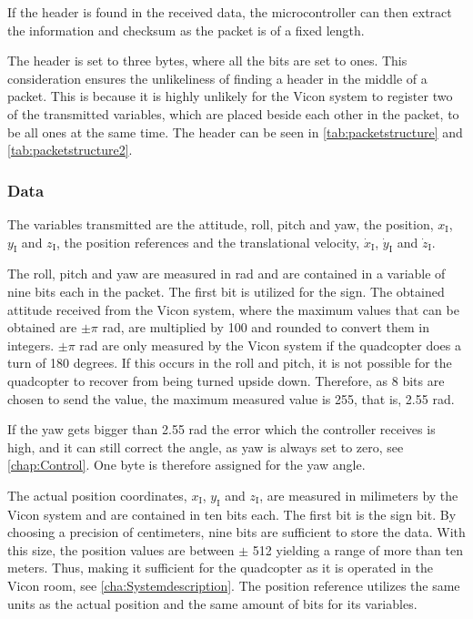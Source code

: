 If the header is found in the received data, the microcontroller can then extract the information and checksum as the packet is of a fixed length. 

The header is set to three bytes, where all the bits are set to ones. This consideration ensures the unlikeliness of finding a header in the middle of a packet. This is because it is highly unlikely for the Vicon system to register two of the transmitted variables, which are placed beside each other in the packet, to be all ones at the same time. The header can be seen in \autoref{tab:packetstructure} and \autoref{tab:packetstructure2}.

\subsubsection{Data} 
The variables transmitted are the attitude, roll, pitch and yaw, the position, $x_{\mathrm{I}}$, $y_{\mathrm{I}}$ and $z_{\mathrm{I}}$, the position references and the translational velocity, $\dot{x}_{\mathrm{I}}$, $\dot{y}_{\mathrm{I}}$ and $\dot{z}_{\mathrm{I}}$. 

The roll, pitch and yaw are measured in rad and are contained in a variable of nine bits each in the packet. The first bit is utilized for the sign. The obtained attitude received from the Vicon system, where the maximum values that can be obtained are $\pm\pi$ rad, are multiplied by 100 and rounded to convert them in integers. $\pm\pi$ rad are only measured by the Vicon system if the quadcopter does a turn of 180 degrees. If this occurs in the roll and pitch, it is not possible for the quadcopter to recover from being turned upside down. Therefore, as 8 bits are chosen to send the value, the maximum measured value is 255, that is, 2.55 rad.

%
%

If the yaw gets bigger than 2.55 rad the error which the controller receives is high, and it can still correct the angle, as yaw is always set to zero, see \autoref{chap:Control}. One byte is therefore assigned for the yaw angle.

The actual position coordinates, $x_{\mathrm{I}}$, $y_{\mathrm{I}}$ and $z_{\mathrm{I}}$, are measured in milimeters by the Vicon system and are contained in ten bits each. The first bit is the sign bit. By choosing a precision of centimeters, nine bits are sufficient to store the data. With this size, the position values are between $\pm$ 512 yielding a range of more than ten meters. Thus, making it sufficient for the quadcopter as it is operated in the Vicon room, see \autoref{cha:Systemdescription}. The position reference utilizes the same units as the actual position and the same amount of bits for its variables.

